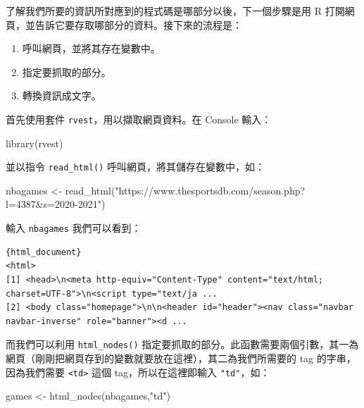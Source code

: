 \documentclass[
]{book}
\newenvironment{Shaded}{\begin{snugshade}}{\end{snugshade}}
\newcommand{\FunctionTok}[1]{\textcolor[rgb]{0.00,0.00,0.00}{#1}}
\newcommand{\NormalTok}[1]{#1}
\newcommand{\OtherTok}[1]{\textcolor[rgb]{0.56,0.35,0.01}{#1}}
\newcommand{\StringTok}[1]{\textcolor[rgb]{0.31,0.60,0.02}{#1}}
\providecommand{\tightlist}{%
  \setlength{\itemsep}{0pt}\setlength{\parskip}{0pt}}
\theoremstyle{definition}
\theoremstyle{remark}
\begin{document}
了解我們所要的資訊所對應到的程式碼是哪部分以後，下一個步驟是用 R 打開網頁，並告訴它要存取哪部分的資料。接下來的流程是：

\begin{enumerate}
\def\labelenumi{\arabic{enumi}.}
\tightlist
\item
  呼叫網頁，並將其存在變數中。
\item
  指定要抓取的部分。
\item
  轉換資訊成文字。
\end{enumerate}

首先使用套件 \texttt{rvest}，用以擷取網頁資料。在 Console 輸入：

\begin{Shaded}
\begin{Highlighting}[]
\FunctionTok{library}\NormalTok{(rvest)}
\end{Highlighting}
\end{Shaded}

並以指令 \texttt{read\_html()} 呼叫網頁，將其儲存在變數中，如：

\begin{Shaded}
\begin{Highlighting}[]
\NormalTok{nbagames }\OtherTok{\textless{}{-}} \FunctionTok{read\_html}\NormalTok{(}\StringTok{"https://www.thesportsdb.com/season.php?l=4387\&s=2020{-}2021"}\NormalTok{)}
\end{Highlighting}
\end{Shaded}

輸入 \texttt{nbagames} 我們可以看到：

\begin{verbatim}
{html_document}
<html>
[1] <head>\n<meta http-equiv="Content-Type" content="text/html; charset=UTF-8">\n<script type="text/ja ...
[2] <body class="homepage">\n\n<header id="header"><nav class="navbar navbar-inverse" role="banner"><d ...
\end{verbatim}

而我們可以利用 \texttt{html\_nodes()} 指定要抓取的部分。此函數需要兩個引數，其一為網頁（剛剛把網頁存到的變數就要放在這裡），其二為我們所需要的 tag 的字串，因為我們需要 \texttt{\textless{}td\textgreater{}} 這個 tag，所以在這裡即輸入 \texttt{"td"}，如：

\begin{Shaded}
\begin{Highlighting}[]
\NormalTok{games }\OtherTok{\textless{}{-}} \FunctionTok{html\_nodes}\NormalTok{(nbagames,}\StringTok{"td"}\NormalTok{)}
\end{Highlighting}
\end{Shaded}
\end{document}
